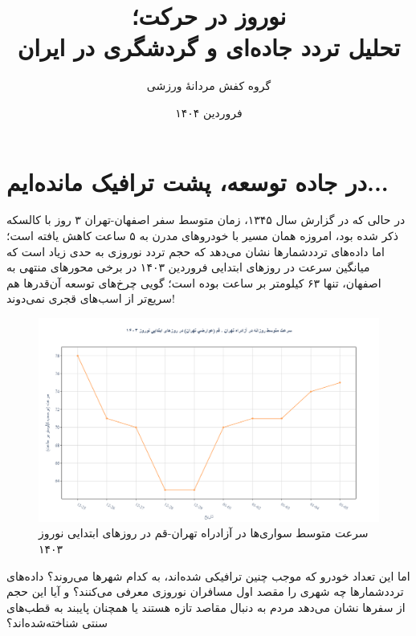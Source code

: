 \documentclass[a4paper, 12pt]{article}
\begin{document}
\title{نوروز در حرکت؛\\ تحلیل تردد جاده‌ای و گردشگری در ایران}
\author{گروه کفش مردانهٔ ورزشی}
\date{فروردین ۱۴۰۴}
\maketitle

\section{در جاده توسعه، پشت ترافیک مانده‌ایم...}
در حالی که در گزارش سال ۱۳۴۵، زمان متوسط سفر اصفهان-تهران ۳ روز با کالسکه ذکر شده بود، امروزه همان مسیر با خودروهای مدرن به ۵ ساعت کاهش یافته است؛ اما داده‌های ترددشمارها نشان می‌دهد که حجم تردد نوروزی به حدی زیاد است که میانگین سرعت در روزهای ابتدایی فروردین ۱۴۰۳ در برخی محورهای منتهی به اصفهان، تنها ۶۳ کیلومتر بر ساعت بوده است؛ گویی چرخ‌های توسعه آن‌قدرها هم سریع‌تر از اسب‌های قجری نمی‌دوند!

\begin{figure}[htbp]
    \centering
    \includegraphics[width=1\textwidth]{first_part.png}
    \caption{سرعت متوسط سواری‌ها در آزادراه تهران-قم در روزهای ابتدایی نوروز ۱۴۰۳}
\end{figure}

اما این تعداد خودرو که موجب چنین ترافیکی شده‌اند، به کدام شهرها می‌روند؟ داده‌های ترددشمارها چه شهری را مقصد اول مسافران نوروزی معرفی می‌کنند؟ و آیا این حجم از سفرها نشان می‌دهد مردم به دنبال مقاصد تازه هستند یا همچنان پایبند به قطب‌های سنتی شناخته‌شده‌اند؟
\end{document}
